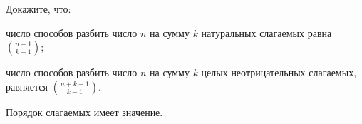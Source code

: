 Докажите, что:
\begin{enumcyr}
    \item число способов разбить число $n$ на сумму $k$ натуральных слагаемых равна
        $\binom{n - 1}{k - 1}$; 
    \item число способов разбить число $n$ на сумму $k$ целых неотрицательных слагаемых, равняется
        $\binom{n + k - 1}{k - 1}$.
\end{enumcyr}

Порядок слагаемых имеет значение.